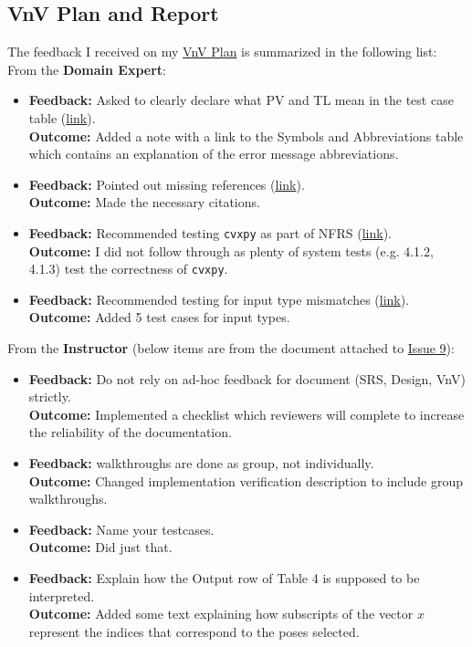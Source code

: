 \documentclass{article}
\begin{document}
\subsection{VnV Plan and Report}
The feedback I received on my \href{https://github.com/husseinsd1/optimal-em-arrangement/blob/main/docs/VnVPlan/VnVPlan.pdf}{VnV Plan} is summarized in the following list:\\
From the \textbf{Domain Expert}:
\begin{itemize}
    \item \textbf{Feedback: }Asked to clearly declare what PV and TL mean in the test case table (\href{https://github.com/husseinsd1/optimal-em-arrangement/issues/12}{link}).  \\
          \textbf{Outcome: }Added a note with a link to the Symbols and Abbreviations table which contains an explanation of the error message abbreviations.  
    \item \textbf{Feedback: }Pointed out missing references (\href{https://github.com/husseinsd1/optimal-em-arrangement/issues/14}{link}).  \\
          \textbf{Outcome: }Made the necessary citations.  
    \item \textbf{Feedback: }Recommended testing \texttt{cvxpy} as part of NFRS (\href{https://github.com/husseinsd1/optimal-em-arrangement/issues/15}{link}).  \\
          \textbf{Outcome: }I did not follow through as plenty of system tests (e.g. 4.1.2, 4.1.3) test the correctness of \texttt{cvxpy}.  
          \item \textbf{Feedback: }Recommended testing for input type mismatches (\href{https://github.com/husseinsd1/optimal-em-arrangement/issues/16}{link}).  \\
          \textbf{Outcome: }Added 5 test cases for input types.     
    \end{itemize} 
From the \textbf{Instructor} (below items are from the document attached to \href{https://github.com/husseinsd1/optimal-em-arrangement/issues/9}{Issue 9}):
\begin{itemize}
    \item \textbf{Feedback: }Do not rely on ad-hoc feedback for document (SRS, Design, VnV) strictly.  \\
    \textbf{Outcome: }Implemented a checklist which reviewers will complete to increase the reliability of the documentation. 
    \item \textbf{Feedback: }walkthroughs are done as group, not individually.  \\
    \textbf{Outcome: }Changed implementation verification description to include group walkthroughs. 
    \item \textbf{Feedback: }Name your testcases.  \\
    \textbf{Outcome: }Did just that. 
    \item \textbf{Feedback: }Explain how the Output row of Table 4 is supposed to be interpreted.  \\
    \textbf{Outcome: }Added some text explaining how subscripts of the vector $x$ represent the indices that correspond to the poses selected. 
\end{itemize}
\end{document}
